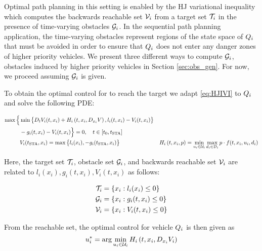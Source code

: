 Optimal path planning in this setting is enabled by the HJ variational inequality which computes the backwards reachable set $\mathcal{V}_i$ from a target set $\mathcal{T}_i$ in the presence of time-varying obstacles $\mathcal{G}_i$. In the sequential path planning application, the time-varying obstacles represent regions of the state space of $Q_i$ that must be avoided in order to ensure that $Q_i$ does not enter any danger zones of higher priority vehicles. We present three different ways to compute $\mathcal{G}_i$, obstacles induced by higher priority vehicles in Section \ref{sec:obs_gen}. For now, we proceed assuming $\mathcal{G}_i$ is given.

To obtain the optimal control for to reach the target we adapt \eqref{eq:HJIVI} to $Q_i$ and solve the following PDE:

\begin{equation}
\label{eq:HJIVI_i}
\begin{aligned}
\max\Big\{&\min\big\{D_t V_i(t, x_i) + H_i\left(t, x_i, D_{x_i} V\right), l_i(t, x_i) - V_i(t, x_i)\big\}\\
& -g_i(t, x_i) - V_i(t, x_i)\Big\} = 0, \quad t \in [t_0, t_\text{STA}]\\
&V_i(t_\text{STA}, x_i) = \max\big\{l_i(x_i), -g_i(t_\text{STA}, x_i)\big\}
&H_i\left(t, x_i, p\right) = \min_{u_i \in \mathcal{U}_i} \max_{d_i \in \mathcal{D}_i} p \cdot f(t, x_i, u_i, d_i)
\end{aligned}
\end{equation}

Here, the target set $\mathcal{T}_i$, obstacle set $\mathcal{G}_i$, and backwards reachable set $\mathcal{V}_i$ are related to $l_i(x_i), g_i(t, x_i), V_i(t, x_i)$ as follows:

\begin{equation}
\begin{aligned}
\mathcal{T}_i &= \{x_i: l_i(x_i) \le 0\} \\
\mathcal{G}_i &= \{x_i: g_i(t, x_i) \le 0\} \\
\mathcal{V}_i &= \{x_i: V_i(t, x_i) \le 0\}
\end{aligned}
\end{equation}

From the reachable set, the optimal control for vehicle $Q_i$ is then given as
\begin{equation}
\label{eq:opt_ctrl_i}
u_i^* = \arg \min_{u_i \in \mathcal{U}_i} H_i\left(t, x_i, D_{x_i} V_i\right)
\end{equation}